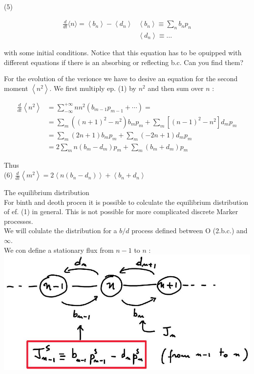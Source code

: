\documentclass[10pt]{article}
\begin{document}
(5)

$$
\begin{array}{ll}
\frac{d}{d t}\langle n\rangle=\left\langle b_{n}\right\rangle-\left\langle d_{n}\right\rangle & \left\langle b_{n}\right\rangle \equiv \sum_{n} b_{n} p_{n} \\
& \left\langle d_{n}\right\rangle \equiv \ldots
\end{array}
$$

with some initial conditions. Notice that this equation has to be opuipped with different equations if there is an absorbing or reflecting b.c. Can you find them?

For the evolution of the verionce we have to desive an equation for the second moment $\left\langle n^{2}\right\rangle$. We first multiply ep. (1) by $n^{2}$ and then sum over $n$ :

$$
\begin{aligned}
\frac{d}{d t}\left\langle n^{2}\right\rangle & =\sum_{-\infty}^{+\infty} n n^{2}\left(b_{m-1} p_{m-1}+\cdots\right)= \\
& =\sum_{m}\left((n+1)^{2}-n^{2}\right) b_{m} p_{m}+\sum_{m}\left[(n-1)^{2}-n^{2}\right] d_{m} p_{m} \\
& =\sum_{m}(2 n+1) b_{m} p_{m}+\sum_{m}(-2 n+1) d_{m} p_{m} \\
& =2 \sum_{m} n\left(b_{m}-d_{m}\right) p_{m}+\sum_{m}\left(b_{m}+d_{m}\right) p_{m}
\end{aligned}
$$

Thus\\
(6) $\frac{d}{d t}\left\langle m^{2}\right\rangle=2\left\langle n\left(b_{n}-d_{n}\right)\right\rangle+\left\langle b_{n}+d_{n}\right\rangle$

The equilibrium distribution\\
For binth and deoth procen it is possible to colculate the equilibrium distribution of ef. (1) in general. This is not possible for more complicated discrete Marker processes.\\
We will colulate the distribution for a $b / d$ process defined between O (2.b.c.) and $\infty$.\\
We con define a stationary flux from $n-1$ to $n$ :\\
\includegraphics[max width=\textwidth, center]{2025_10_17_3daf2a002a8f5936c90eg-05}
\end{document}

